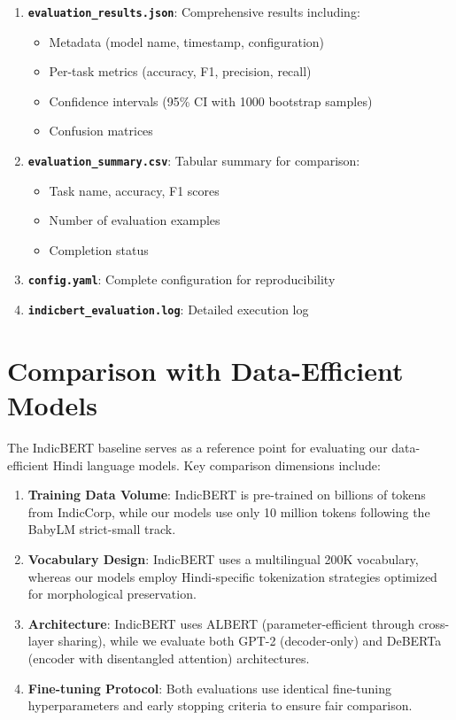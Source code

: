\begin{enumerate}
    \item \textbf{\texttt{evaluation\_results.json}}: Comprehensive results including:
    \begin{itemize}
        \item Metadata (model name, timestamp, configuration)
        \item Per-task metrics (accuracy, F1, precision, recall)
        \item Confidence intervals (95\% CI with 1000 bootstrap samples)
        \item Confusion matrices
    \end{itemize}

    \item \textbf{\texttt{evaluation\_summary.csv}}: Tabular summary for comparison:
    \begin{itemize}
        \item Task name, accuracy, F1 scores
        \item Number of evaluation examples
        \item Completion status
    \end{itemize}

    \item \textbf{\texttt{config.yaml}}: Complete configuration for reproducibility

    \item \textbf{\texttt{indicbert\_evaluation.log}}: Detailed execution log
\end{enumerate}

\section{Comparison with Data-Efficient Models}
\label{sec:comparison}

The IndicBERT baseline serves as a reference point for evaluating our data-efficient Hindi language models. Key comparison dimensions include:

\begin{enumerate}
    \item \textbf{Training Data Volume}: IndicBERT is pre-trained on billions of tokens from IndicCorp, while our models use only 10 million tokens following the BabyLM strict-small track.

    \item \textbf{Vocabulary Design}: IndicBERT uses a multilingual 200K vocabulary, whereas our models employ Hindi-specific tokenization strategies optimized for morphological preservation.

    \item \textbf{Architecture}: IndicBERT uses ALBERT (parameter-efficient through cross-layer sharing), while we evaluate both GPT-2 (decoder-only) and DeBERTa (encoder with disentangled attention) architectures.

    \item \textbf{Fine-tuning Protocol}: Both evaluations use identical fine-tuning hyperparameters and early stopping criteria to ensure fair comparison.
\end{enumerate}

